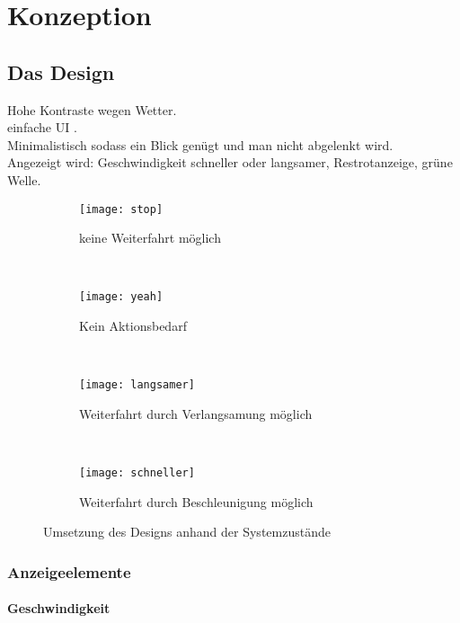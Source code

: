\chapter{\label{chap:entwurf}Konzeption}
\section{Das Design}
Hohe Kontraste wegen Wetter.\\
einfache UI .\\
Minimalistisch sodass ein Blick genügt und man nicht abgelenkt wird.\\
Angezeigt wird: Geschwindigkeit schneller oder langsamer, 
Restrotanzeige, grüne Welle.
\begin{figure}[H]
        \centering
           \begin{subfigure}[t]{0.23\textwidth}
                \texttt{[image: stop]}
                \caption[Systemzustand d]{keine Weiterfahrt möglich}
                \label{fig:stop}
        \end{subfigure}
           ~ 
              \begin{subfigure}[t]{0.23\textwidth}
                \texttt{[image: yeah]}
                \caption[Systemzustand c]{Kein Aktionsbedarf}
                \label{fig:yeah}
        \end{subfigure}
           ~
        \begin{subfigure}[t]{0.23\textwidth}
                \texttt{[image: langsamer]}
                \caption[Systemzustand a]{Weiterfahrt durch Verlangsamung  möglich}
                \label{fig:langsamer}
        \end{subfigure}
        ~
        \begin{subfigure}[t]{0.23\textwidth}
                \texttt{[image: schneller]}
                \caption[Systemzustand b]{Weiterfahrt durch Beschleunigung möglich}
                \label{fig:schneller}
        \end{subfigure}     
        \caption[Systemzustände im Ampelbereich]{Umsetzung des Designs anhand der Systemzustände}
        \label{fig:mockup}
\end{figure} 
\subsection{Anzeigeelemente}
\subsubsection{Geschwindigkeit}
